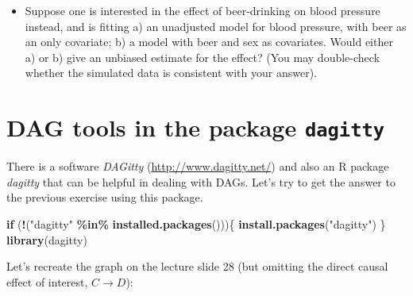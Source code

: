 \documentclass[
]{book}
\newenvironment{Shaded}{\begin{snugshade}}{\end{snugshade}}
\newcommand{\ControlFlowTok}[1]{\textcolor[rgb]{0.13,0.29,0.53}{\textbf{#1}}}
\newcommand{\DecValTok}[1]{\textcolor[rgb]{0.00,0.00,0.81}{#1}}
\newcommand{\FunctionTok}[1]{\textcolor[rgb]{0.13,0.29,0.53}{\textbf{#1}}}
\newcommand{\NormalTok}[1]{#1}
\newcommand{\OtherTok}[1]{\textcolor[rgb]{0.56,0.35,0.01}{#1}}
\newcommand{\SpecialCharTok}[1]{\textcolor[rgb]{0.81,0.36,0.00}{\textbf{#1}}}
\newcommand{\StringTok}[1]{\textcolor[rgb]{0.31,0.60,0.02}{#1}}
\providecommand{\tightlist}{%
  \setlength{\itemsep}{0pt}\setlength{\parskip}{0pt}}
\begin{document}
\begin{Shaded}
\end{Shaded}

\begin{itemize}
\tightlist
\item
  Suppose one is interested in the effect of beer-drinking on blood pressure instead, and is fitting a) an unadjusted model for blood pressure, with beer as an only covariate; b) a model with beer and sex as covariates. Would either a) or b) give an unbiased estimate for the effect? (You may double-check whether the simulated data is consistent with your answer).
\end{itemize}

\section{\texorpdfstring{DAG tools in the package \texttt{dagitty}}{DAG tools in the package dagitty}}\label{dag-tools-in-the-package-dagitty}

There is a software \emph{DAGitty} (\url{http://www.dagitty.net/}) and also an R package \emph{dagitty} that can be helpful in dealing with DAGs. Let's try to get the answer to the previous exercise using this package.

\begin{Shaded}
\begin{Highlighting}[]
\ControlFlowTok{if}\NormalTok{ (}\SpecialCharTok{!}\NormalTok{(}\StringTok{"dagitty"} \SpecialCharTok{\%in\%} \FunctionTok{installed.packages}\NormalTok{()))\{}
  \FunctionTok{install.packages}\NormalTok{(}\StringTok{"dagitty"}\NormalTok{)}
\NormalTok{\}}
\FunctionTok{library}\NormalTok{(dagitty)}
\end{Highlighting}
\end{Shaded}

Let's recreate the graph on the lecture slide 28 (but omitting the direct causal effect of interest, \(C \rightarrow D\)):
\end{document}
